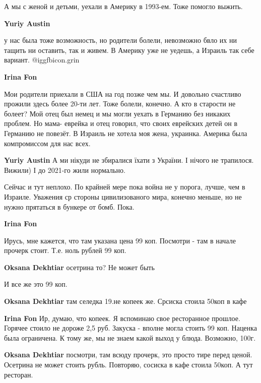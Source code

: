 \begin{itemize}
\begin{itemize}
А мы с женой и детьми, уехали в Америку в 1993-ем. Тоже помогло выжить.

\begin{itemize} %
\textbf{Yuriy Austin} 

у нас была тоже возможность, но родители болели, невозможно бвло их ни тащить
ни оставить, так и живем. В Америку уже не уедешь, а Израиль так себе вариант.
@igg{fbicon.grin} 

\textbf{Irina Fon} 

Мои родители приехали в США на год позже чем мы. И довольно счастливо прожили
здесь более 20-ти лет. Тоже болели, конечно. А кто в старости не болеет? Мой
отец был немец и мы могли уехать в Германию без никаких проблем. Но мама-
еврейка и отец говорил, что своих еврейских детей он в Германию не повезёт. В
Израиль не хотела моя жена, украинка. Америка была компромиссом для нас всех.

\textbf{Yuriy Austin} А ми нікуди не збиралися їхати з України. І нічого не трапилося. Вижили) І до 2021-го жили нормально.
\end{itemize} %


Сейчас и тут неплохо. По крайней мере пока война не у порога, лучше, чем в
Израиле. Уважения ср стороны цивилизованого мира, конечно меньше, но не нужно
прятаться в бункере от бомб. Пока.

\textbf{Irina Fon} 

Ирусь, мне кажется, что там указана цена 99 коп. Посмотри - там в начале
прочерк стоит. Т.е. ноль рублей 99 коп.

\begin{itemize} %
\textbf{Oksana Dekhtiar} осетрина то? Не может быть

И все же это 99 коп.

\textbf{Oksana Dekhtiar} там селедка 19.не копеек же. Срсиска стоила 50коп в кафе

\textbf{Irina Fon} Ир, думаю, что копеек. Я вспоминаю свое ресторанное прошлое. Горячее стоило не дороже 2,5 руб. Закуска - вполне могла стоить 99 коп. Наценка была ограничена. К тому же, мы не знаем какой выход у блюда. Возможно, 100г.

\textbf{Oksana Dekhtiar} посмотри, там всюду прочерк, это просто тире перед ценой. Осетрина не может стоить рубль. Повторяю, сосиска в кафе стоила 50коп. А тут ресторан.


\end{itemize}
\end{itemize}
\end{itemize}
